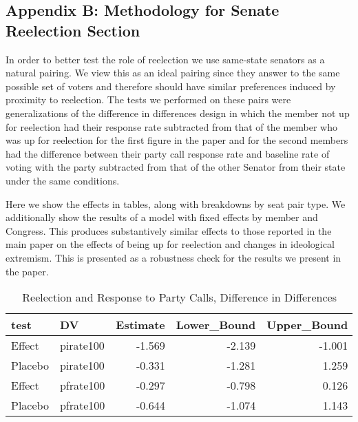 \documentclass[12pt]{article}
\begin{document}
\subsection{Appendix B: Methodology for Senate Reelection Section}

In order to better test the role of reelection we use same-state senators as a natural pairing. We view this as an ideal pairing since they answer to the same possible set of voters and therefore should have similar preferences induced by proximity to reelection. The tests we performed on these pairs were generalizations of the difference in differences design in which the member not up for reelection had their response rate subtracted from that of the member who was up for reelection for the first figure in the paper and for the second members had the difference between their party call response rate and baseline rate of voting with the party subtracted from that of the other Senator from their state under the same conditions. 

Here we show the effects in tables, along with breakdowns by seat pair type. We additionally show the results of a model with fixed effects by member and Congress. This produces substantively similar effects to those reported in the main paper on the effects of being up for reelection and changes in ideological extremism. This is presented as a robustness check for the results we present in the paper.

\begin{table}[H]
	\centering
	\caption{Reelection and Response to Party Calls, Difference in Differences} 
	\begin{tabular}{llrrr}
		\hline
		test & DV & Estimate & Lower\_Bound & Upper\_Bound \\ 
		\hline
		Effect & pirate100 & -1.569 & -2.139 & -1.001 \\ 
		Placebo & pirate100 & -0.331 & -1.281 & 1.259 \\ 
		Effect & pfrate100 & -0.297 & -0.798 & 0.126 \\ 
		Placebo & pfrate100 & -0.644 & -1.074 & 1.143 \\ 
		\hline
	\end{tabular}
\end{table}
\end{document}
